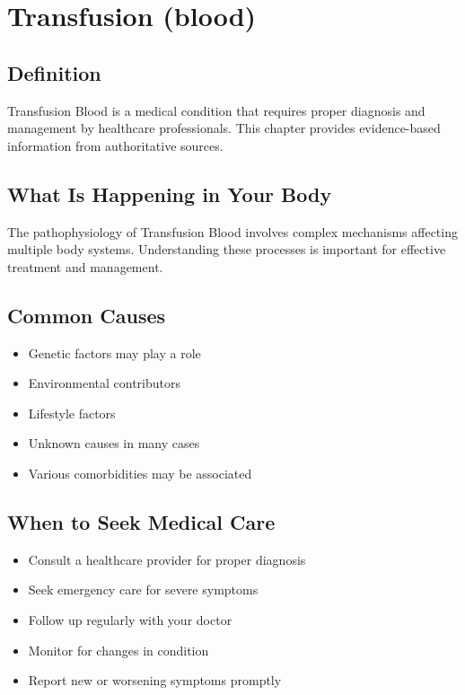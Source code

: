 
\chapter{Transfusion (blood)}

\section*{Definition}
Transfusion Blood is a medical condition that requires proper diagnosis and management by healthcare professionals. This chapter provides evidence-based information from authoritative sources.

\section*{What Is Happening in Your Body}
The pathophysiology of Transfusion Blood involves complex mechanisms affecting multiple body systems. Understanding these processes is important for effective treatment and management.

\section*{Common Causes}
\begin{itemize}
  \item Genetic factors may play a role
  \item Environmental contributors
  \item Lifestyle factors
  \item Unknown causes in many cases
  \item Various comorbidities may be associated
\end{itemize}

\section*{When to Seek Medical Care}
\begin{itemize}
  \item Consult a healthcare provider for proper diagnosis
  \item Seek emergency care for severe symptoms
  \item Follow up regularly with your doctor
  \item Monitor for changes in condition
  \item Report new or worsening symptoms promptly
\end{itemize}

